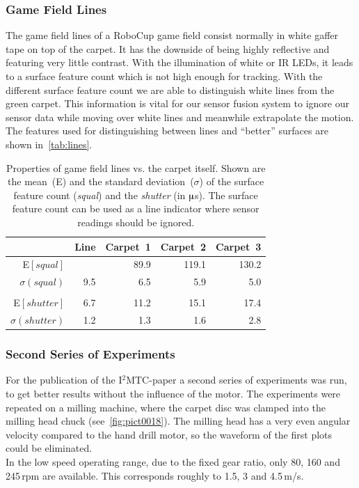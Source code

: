 \documentclass[12pt,a4paper]{article}
\begin{document}
\subsubsection{Game Field Lines}

The game field lines of a RoboCup game field consist normally in white gaffer tape on top of the carpet.
It has the downside of being highly reflective and featuring very little contrast.
With the illumination of white or IR LEDs, it leads to a surface feature count which is not high enough for tracking.
With the different surface feature count we are able to distinguish white lines from the green carpet.
This information is vital for our sensor fusion system to ignore our sensor data while moving over white lines and meanwhile extrapolate the motion.
The features used for distinguishing between lines and ``better'' surfaces are shown in~\autoref{tab:lines}.

\begin{table}[htbp]
    \centering
    \begin{tabular}{r|r|r|r|r}
       & Line & Carpet~1 & Carpet~2 & Carpet~3 \\
       \hline
       E$[ squal ] $     & \color{red}{13.5}  &  89.9  & 119.1 & 130.2    \\
       $\sigma ( squal ) $ & 9.5   &  6.5   & 5.9   & 5.0     \\
       & & & & \\
       E$[ shutter  ]  $ & 6.7  &  11.2  & 15.1  & 17.4     \\
       $\sigma ( shutter)$ & 1.2  &  1.3   & 1.6   & 2.8     \\

    \end{tabular}
  \caption{\label{tab:lines}Properties of game field lines vs. the carpet itself.
  Shown are the mean~(E) and the standard deviation~($\sigma$) of the surface feature count (\emph{squal}) and the \emph{shutter} (in $\muup$s).
  The surface feature count can be used as a line indicator where sensor readings should be ignored.}
\end{table}

\newpage

\subsubsection{Second Series of Experiments}

For the publication of the I$^2$MTC-paper a second series of experiments was run, to get better results without the influence of the motor.
The experiments were repeated on a milling machine, where the carpet disc was clamped into the milling head chuck (see~\autoref{fig:pict0018}).
The milling head has a very even angular velocity compared to the hand drill motor, so the waveform of the first plots could be eliminated.\\
In the low speed operating range, due to the fixed gear ratio, only 80, 160 and 245\,rpm are available. 
This corresponds roughly to 1.5, 3 and 4.5\,m/s.
\end{document}
